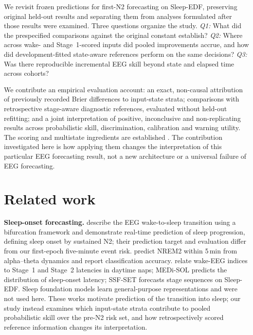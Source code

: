 \documentclass{article}
\begin{document}
We revisit frozen predictions for first-N2 forecasting on Sleep-EDF, preserving original held-out results and separating them from analyses formulated after those results were examined. Three questions organize the study. \emph{Q1:} What did the prespecified comparisons against the original constant establish? \emph{Q2:} Where across wake- and Stage~1-scored inputs did pooled improvements accrue, and how did development-fitted state-aware references perform on the same decisions? \emph{Q3:} Was there reproducible incremental EEG skill beyond state and elapsed time across cohorts?

We contribute an empirical evaluation account: an exact, non-causal attribution of previously recorded Brier differences to input-state strata; comparisons with retrospective stage-aware diagnostic references, evaluated without held-out refitting; and a joint interpretation of positive, inconclusive and non-replicating results across probabilistic skill, discrimination, calibration and warning utility. The scoring and multistate ingredients are established \citep{murphy1973partition,graf1999assessment,putter2007multistate,vancalster2019calibration}. The contribution investigated here is how applying them changes the interpretation of this particular EEG forecasting result, not a new architecture or a universal failure of EEG forecasting.

\section{Related work}
\label{sec:related}

\textbf{Sleep-onset forecasting.} \citet{li2025falling} describe the EEG wake-to-sleep transition using a bifurcation framework and demonstrate real-time prediction of sleep progression, defining sleep onset by sustained N2; their prediction target and evaluation differ from our first-epoch five-minute event risk. \citet{su2026presleep} predict NREM2 within 5\,min from alpha--theta dynamics and report classification accuracy. \citet{beppu2025latency} relate wake-EEG indices to Stage~1 and Stage~2 latencies in daytime naps; MEDi-SOL \citep{oh2024medisol} predicts the distribution of sleep-onset latency; SSF-SET \citep{kweon2026ssfset} forecasts stage sequences on Sleep-EDF. Sleep foundation models \citep{huang2026sleepgpt,thapa2026sleepfm} learn general-purpose representations and were not used here. These works motivate prediction of the transition into sleep; our study instead examines which input-state strata contribute to pooled probabilistic skill over the pre-N2 risk set, and how retrospectively scored reference information changes its interpretation.
\end{document}
